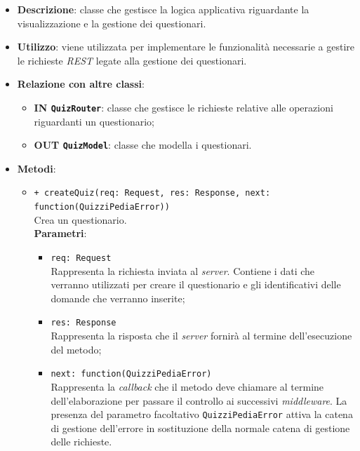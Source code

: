 \begin{itemize}
	\item \textbf{Descrizione}:
	classe che gestisce la logica applicativa riguardante la visualizzazione e la gestione dei questionari.
	\item \textbf{Utilizzo}:
	viene utilizzata per implementare le funzionalità necessarie a gestire le richieste \textit{REST} legate alla gestione dei questionari.
	\item \textbf{Relazione con altre classi}:
	\begin{itemize}
			\item \textbf{IN \texttt{QuizRouter}}:
			classe che gestisce le richieste relative alle operazioni riguardanti un questionario;
			\item \textbf{OUT \texttt{QuizModel}}:
			classe che modella i questionari.
	\end{itemize}
	\item \textbf{Metodi}:
	\begin{itemize}
		\item \texttt{+ createQuiz(req: Request, res: Response, next: function(QuizziPediaError))}\\
		Crea un questionario.\\
		\textbf{Parametri}:
		\begin{itemize}
			\item \texttt{req: Request}\\
			Rappresenta la richiesta inviata al \textit{server}. Contiene i dati che verranno utilizzati per creare il questionario e gli identificativi delle domande che verranno inserite;
			\item \texttt{res: Response}\\
			Rappresenta la risposta che il \textit{server} fornirà al termine dell'esecuzione del metodo;
			\item \texttt{next: function(QuizziPediaError)}\\
			Rappresenta la \textit{callback} che il metodo deve chiamare al termine dell'elaborazione per passare il controllo ai successivi \textit{middleware}. La presenza del parametro facoltativo \texttt{QuizziPediaError} attiva la catena di gestione dell'errore in sostituzione della normale catena di gestione delle richieste.
		\end{itemize}
	

\end{itemize}
\end{itemize}
